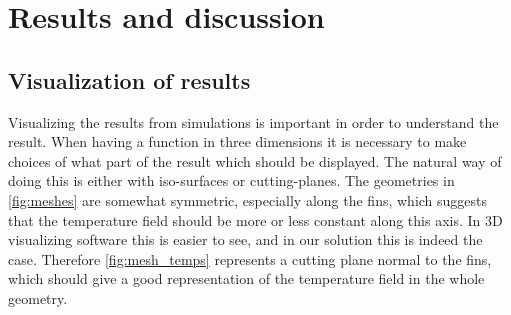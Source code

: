 \section{Results and discussion}



\subsection{Visualization of results}
Visualizing the results from simulations is important in order to understand the result. When having a function in three dimensions it is necessary to make choices of what part of the result which should be displayed. The natural way of doing this is either with iso-surfaces or cutting-planes. The geometries in \cref{fig:meshes} are somewhat symmetric, especially along the fins, which suggests that the temperature field should be more or less constant along this axis. In 3D visualizing software this is easier to see, and in our solution this is indeed the case. Therefore \cref{fig:mesh_temps} represents a cutting plane normal to the fins, which should give a good representation of the temperature field in the whole geometry.

